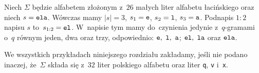 \documentclass{praca1}
\begin{document}


\begin{example}
Niech $\Sigma$ będzie alfabetem złożonym z~$26$ małych liter alfabetu łacińskiego oraz niech $s = \verb|ela|$. Wówczas mamy $|s| = 3$, $s_1 = \verb|e|$, $s_2 = \verb|l|$, $s_3 = \verb|a|$. Podnapis $1\!\!:\!\!2$ napisu $s$ to~$s_{1:2} = \verb|el|$. W~napisie tym mamy do~czynienia jedynie z~$q$-gramami o~$q$ równym jeden, dwa oraz trzy, odpowiednio: $\verb|e|,\ \verb|l|,\ \verb|a|$; $\verb|el|,\ \verb|la|$ oraz $\verb|ela|$.
\end{example}


We wszystkich przykładach niniejszego rozdziału zakładamy, jeśli nie podano inaczej, że~$\Sigma$ składa się z~$32$ liter polskiego alfabetu oraz liter \verb|q|, \verb|v| i~\verb|x|.


\end{document}

